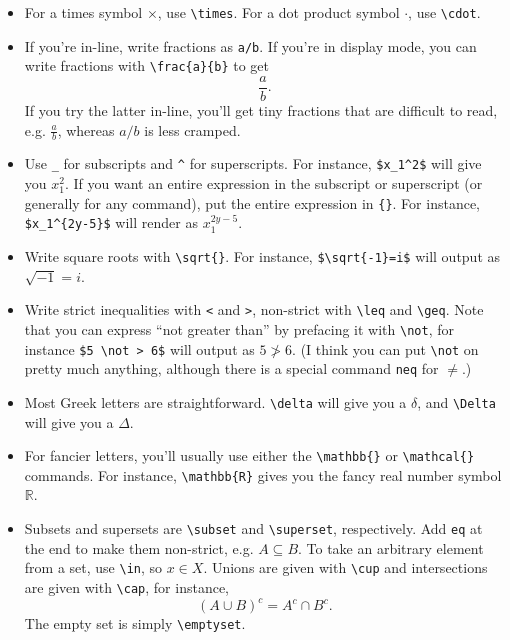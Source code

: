 \documentclass[12pt]{article}
\begin{document}
	\begin{itemize}
\item For a times symbol $\times$, use \verb|\times|. For a dot product symbol
$\cdot$, use \verb|\cdot|.
		
\item If you're in-line, write fractions as \verb|a/b|. If you're in display
mode, you can write fractions with \verb|\frac{a}{b}| to get
			\[ \frac{a}{b}. \]
If you try the latter in-line, you'll get tiny fractions that are difficult to
read, e.g. $\frac{a}{b}$, whereas $a/b$ is less cramped.
		
\item Use \verb|_| for subscripts and \verb|^| for superscripts. For instance,
\verb|$x_1^2$| will give you $x_1^2$. If you want an entire expression in the
subscript or superscript (or generally for any command), put the entire
expression in \verb|{}|. For instance, \verb|$x_1^{2y-5}$| will render as
$x_1^{2y-5}$.
		
\item Write square roots with \verb|\sqrt{}|. For instance, \verb|$\sqrt{-1}=i$|
will output as $\sqrt{-1}=i$.
		
\item Write strict inequalities with \verb|<| and \verb|>|, non-strict with
\verb|\leq| and \verb|\geq|. Note that you can express ``not greater than'' by
prefacing it with \verb|\not|, for instance \verb|$5 \not > 6$| will output as
$5 \not > 6$. (I think you can put \verb|\not| on pretty much anything, although
there is a special command \verb|neq| for $\neq$.)
		
\item Most Greek letters are straightforward. \verb|\delta| will give you a
$\delta$, and \verb|\Delta| will give you a $\Delta$.
		
\item For fancier letters, you'll usually use either the \verb|\mathbb{}| or
\verb|\mathcal{}| commands. For instance, \verb|\mathbb{R}| gives you the fancy
real number symbol $\mathbb{R}$.
		
\item Subsets and supersets are \verb|\subset| and \verb|\superset|,
respectively. Add \verb|eq| at the end to make them non-strict, e.g. $A
\subseteq B$. To take an arbitrary element from a set, use \verb|\in|, so $x \in
X$. Unions are given with \verb|\cup| and intersections are given with
\verb|\cap|, for instance,
			\[	(A \cup B)^c=A^c \cap B^c . \]
		The empty set is simply \verb|\emptyset|. 
		

\end{itemize}
\end{document}
